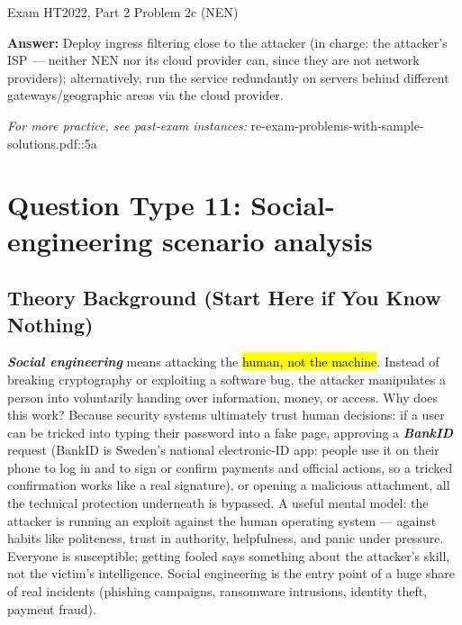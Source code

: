 \documentclass[12pt, a4paper]{article}
\newcommand{\term}[1]{\textbf{\textit{#1}}}        %
\newcommand{\imp}[1]{\hl{#1}}                       %
\begin{document}
\begin{practicebox}{Exam HT2022, Part 2 Problem 2c (NEN)}
\begin{itemize}
\end{itemize}
\textbf{Answer:} Deploy ingress filtering close to the attacker (in charge: the attacker's ISP --- neither NEN nor its cloud provider can, since they are not network providers); alternatively, run the service redundantly on servers behind different gateways/geographic areas via the cloud provider.
\end{practicebox}

\textit{For more practice, see past-exam instances:} re-exam-problems-with-sample-solutions.pdf::5a

\section{Question Type 11: Social-engineering scenario analysis}

\subsection*{Theory Background (Start Here if You Know Nothing)}
\term{Social engineering} means attacking the \imp{human, not the machine}. Instead of breaking cryptography or exploiting a software bug, the attacker manipulates a person into voluntarily handing over information, money, or access. Why does this work? Because security systems ultimately trust human decisions: if a user can be tricked into typing their password into a fake page, approving a \term{BankID} request (BankID is Sweden's national electronic-ID app: people use it on their phone to log in and to sign or confirm payments and official actions, so a tricked confirmation works like a real signature), or opening a malicious attachment, all the technical protection underneath is bypassed. A useful mental model: the attacker is running an exploit against the human operating system --- against habits like politeness, trust in authority, helpfulness, and panic under pressure. Everyone is susceptible; getting fooled says something about the attacker's skill, not the victim's intelligence. Social engineering is the entry point of a huge share of real incidents (phishing campaigns, ransomware intrusions, identity theft, payment fraud).
\end{document}
